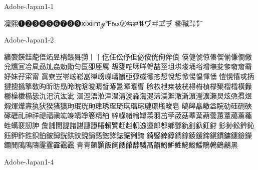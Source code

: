 Adobe-Japan1-1

凜熙❶❷❸❹❺❻❼❽❾ⅺⅻⅿℊ℉℻〄⇆⇄⇅ヷヸヹヺ
㊝㍻㌳㍎

Adobe-Japan1-2

纊褜鍈銈蓜俉炻昱棈鋹曻彅⼁丨仡仼伀伃伹佖侒侊侚侔俍
偀倢俿倞偆偰偂傔僴僘兊兤冝冾凬刕劜劦勀勛匀匤卲厓厲
叝﨎咜咊咩哿喆坙坥垬埈埇﨏增墲夋奓奛奝奣妤妺孖寀甯
寘尞岦岺峵崧嵓嵂嵭嶸嶹巐弡弴彧德忞恝悅悊惞惕愠惲愑
愷愰憘戓抦揵摠撝擎敎昀昕昉昮昤晥晗晙晴晳暙暠暲暿曺
朎杦枻桒柀桄棏﨓楨﨔榘槢樰橫橆橳橾櫢櫤毖氿汜沆汯泚
洄涇浯涖涬淏淸淲淼渹湜渧渼溿澈澵濵瀅瀇瀨炅炫焏焄煜
煆煇燁燾犱犾猤猪獷玽珉珖珣珒琇珵琦琪琩琮璉璟甁畯皂
皜皞皛皦益睆劯砡硎硤硺礰礼神祥禔福禛竑竧靖竫箞精絈
綷綠緖繒罇羡羽茁荢荿菇菶葈蒴蕓蕙蕫﨟薰蘒﨡蠇裵訒訷
詹誧誾諟諸諶譓譿賰賴贒赶﨣軏逸遧郞都鄕鄧釚釗釞釭釮
釤釥鈆鈐鈊鈺鉀鈼鉎鉙鉑鈹鉧銧鉷鉸鋧鋗鋙鋐﨧鋕鋠鋓錥
錡鋻﨨錞鋿錝錂鍰鍗鎤鏆鏞鏸鐱鑅鑈閒﨩隝隯霳霻靃靍靏
⾭靑顗顥飯飼餧館馞驎髙髜魵魲鮏鮱鮻鰀鵰鵫鶴鸙黑

Adobe-Japan1-4

